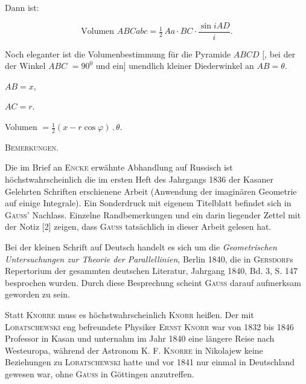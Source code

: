 %
\par
Dann ist:

\[
\text{Volumen } ABCabc = \tfrac{1}{2}\, Aa \cdot BC \cdot \frac{\sin iAD}{i}.
\]


Noch eleganter ist die Volumenbestimmung für die Pyramide $ABCD$ [, bei der der Winkel $ABC$
$= 90^0$ und ein] unendlich kleiner Diederwinkel an $AB = \theta$.

\begin{center}
\begin{minipage}[b]{6.1cm}\begin{center}
$AB = x,$

$AC = r.$

Volumen $= \tfrac{1}{2}(x - r\cos\varphi)\,.\,\theta.$
\end{center}\end{minipage}\hfill
\begin{minipage}[b]{6.5cm}\end{minipage}
\end{center}

\begin{center}


\textsc{Bemerkungen.}
\end{center}


\begingroup\small
Die im Brief an \textsc{Encke} erwähnte Abhandlung auf Russisch ist
höchstwahrscheinlich die im ersten Heft des Jahrgangs 1836 der Kasaner Gelehrten
Schriften erschienene Arbeit  (Anwendung der imaginären Geometrie auf einige Integrale). Ein
Sonderdruck mit eigenem Titelblatt befindet sich in \textsc{Gauss}' Nachlass.
Einzelne Randbemerkungen und ein darin liegender Zettel mit der Notiz
[2] zeigen, dass \textsc{Gauss} tatsächlich in dieser Arbeit gelesen hat.


Bei der kleinen Schrift auf Deutsch handelt es sich um die \emph{Geometrischen Untersuchungen
zur Theorie der Parallellinien}, Berlin 1840, die in \textsc{Gersdorf}s Repertorium
der gesammten deutschen Literatur, Jahrgang 1840, Bd. 3, S. 147 besprochen wurden.
Durch diese Besprechung scheint \textsc{Gauss} darauf aufmerksam geworden zu sein.


Statt \textsc{Knorre} muss es höchstwahrscheinlich \textsc{Knorr} heißen. Der
mit \textsc{Lobatschewski} eng befreundete Physiker \textsc{Ernst Knorr} war von 1832
bis 1846 Professor in Kasan und unternahm im Jahr 1840 eine längere Reise nach Westeuropa,
während der Astronom \textsc{K. F. Knorre} in Nikolajew keine Beziehungen zu
\textsc{Lobatschewski} hatte und vor 1841 nur einmal in Deutschland gewesen war, ohne \textsc{Gauss} in
Göttingen anzutreffen.


